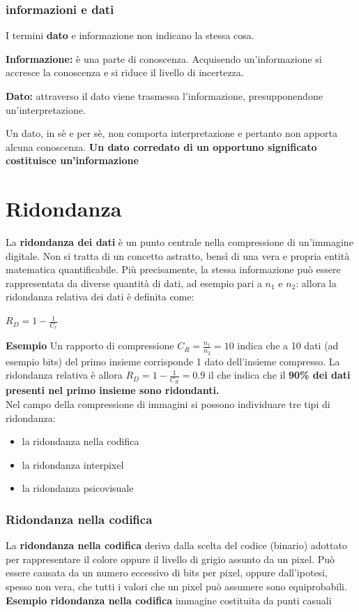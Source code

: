 \subsubsection{informazioni e dati}
I termini \textbf{dato} e informazione non indicano la stessa cosa.
\begin{trivlist}
    \item \textbf{Informazione:} è una parte di conoscenza.
    Acquisendo un'informazione si accresce la conoscenza e si riduce
    il livello di incertezza.
    \item \textbf{Dato: }attraverso il dato viene trasmessa l'informazione,
    presupponendone un'interpretazione.
\end{trivlist}
Un dato, in sè e per sè, non comporta interpretazione e pertanto
non apporta alcuna conoscenza.
\textbf{Un dato corredato di un opportuno significato costituisce un'informazione}

\section{Ridondanza}
La \textbf{ridondanza dei dati} è un punto centrale nella compressione di un'immagine digitale. Non si tratta di un concetto astratto, bensì di una vera e propria entità matematica quantificabile.
Più precisamente, la stessa informazione può essere rappresentata da diverse quantità di dati, ad esempio pari a $n_1$ e $n_2$: allora la
ridondanza relativa dei dati è definita come:

\begin{center}
    $R_D = 1 - \frac{1}{C_r}$
\end{center}

\textbf{Esempio}
Un rapporto di compressione $C_R = \frac{n_1}{n_2} = 10$ indica che a 10 dati (ad esempio bits) del primo insieme corrisponde 1 dato dell'insieme compresso.
La ridondanza relativa è allora $R_D = 1 - \frac{1}{C_R} = 0.9$ il che indica che il \textbf{90\%  dei dati presenti nel primo insieme sono ridondanti.}
\\Nel campo della compressione di immagini si possono individuare
tre tipi di ridondanza:
\begin{itemize}
    \item la ridondanza nella codifica
    \item la ridondanza interpixel
    \item la ridondanza psicovisuale
\end{itemize}

\subsubsection{Ridondanza nella codifica}
La \textbf{ridondanza nella codifica} deriva dalla scelta del codice (binario) adottato per rappresentare il colore oppure il livello di grigio
assunto da un pixel. Può essere causata da un numero eccessivo di bits per pixel, oppure dall'ipotesi, spesso non vera, che tutti i valori che un pixel può assumere sono equiprobabili.
\textbf{Esempio ridondanza nella codifica}
immagine costituita da punti casuali

